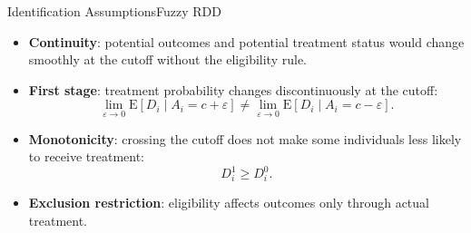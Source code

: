\documentclass[hyperref={pdfpagelabels=false}]{beamer}
\begin{document}
\begin{frame}{Identification Assumptions}{Fuzzy RDD}

\begin{itemize}
  \item \textbf{Continuity}: potential outcomes and potential treatment status would change smoothly at the cutoff without the eligibility rule.

  \vspace{0.2cm}

  \item \textbf{First stage}: treatment probability changes discontinuously at the cutoff:
  \[
    \lim_{\varepsilon\rightarrow 0}\mathrm{E}[D_i\mid A_i=c+\varepsilon]
    \neq
    \lim_{\varepsilon\rightarrow 0}\mathrm{E}[D_i\mid A_i=c-\varepsilon].
  \]

  \vspace{0.2cm}

  \item \textbf{Monotonicity}: crossing the cutoff does not make some individuals less likely to receive treatment:
  \[
    D_i^1 \geq D_i^0.
  \]

  \vspace{0.2cm}

  \item \textbf{Exclusion restriction}: eligibility affects outcomes only through actual treatment.
\end{itemize}

\end{frame}
\end{document}
